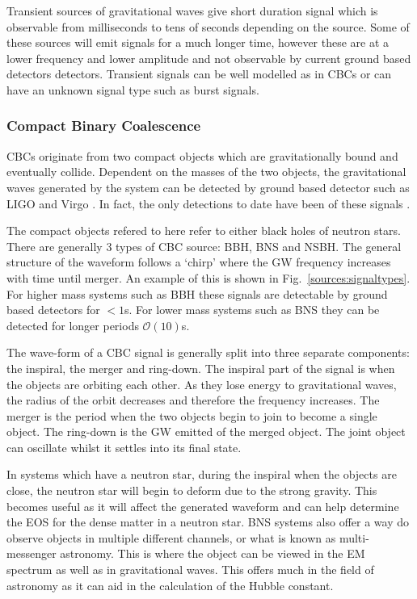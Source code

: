 Transient sources of gravitational waves give short duration signal which is observable from milliseconds to tens of seconds depending on the source. 
Some of these sources will emit signals for a much longer time, however these are at a lower frequency and lower amplitude and not observable by current ground based detectors detectors.
Transient signals can be well modelled as in \acp{CBC} or can have an unknown signal type such as burst signals.

\subsubsection{\label{sources:transient:cbc} Compact Binary Coalescence}

\acp{CBC} originate from two compact objects which are gravitationally bound and eventually collide.
Dependent on the masses of the two objects, the gravitational waves generated by the system can be detected by ground based detector such as LIGO \cite{} and Virgo \cite{}. 
In fact, the only detections to date have been of these signals \cite{}.

The compact objects refered to here refer to either black holes of neutron stars.
There are generally 3 types of \ac{CBC} source: \ac{BBH}, \ac{BNS} and \ac{NSBH}.
The general structure of the waveform follows a `chirp' where the \ac{GW} frequency increases with time until merger. An example of this is shown in Fig.~\ref{sources:signaltypes}.
For higher mass systems such as \ac{BBH} these signals are detectable by ground based detectors for $< 1$s. 
For lower mass systems such as \ac{BNS} they can be detected for longer periods $\mathcal{O}(10)$s. 

The wave-form of a \ac{CBC} signal is generally split into three separate components: the inspiral, the merger and ring-down. 
The inspiral part of the signal is when the objects are orbiting each other. As they lose energy to gravitational waves, the radius of the orbit decreases and therefore the frequency increases.
The merger is the period when the two objects begin to join to become a single object.
The ring-down is the \ac{GW} emitted of the merged object. The joint object can oscillate whilst it settles into its final state. 

In systems which have a neutron star, during the inspiral when the objects are close, the neutron star will begin to deform due to the strong gravity. 
This becomes useful as it will affect the generated waveform and can help determine the \ac{EOS} for the dense matter in a neutron star.
\ac{BNS} systems also offer a way do observe objects in multiple different channels, or what is known as multi-messenger astronomy. 
This is where the object can be viewed in the \ac{EM} spectrum as well as in gravitational waves.
This offers much in the field of astronomy as it can aid in the calculation of the Hubble constant. 

